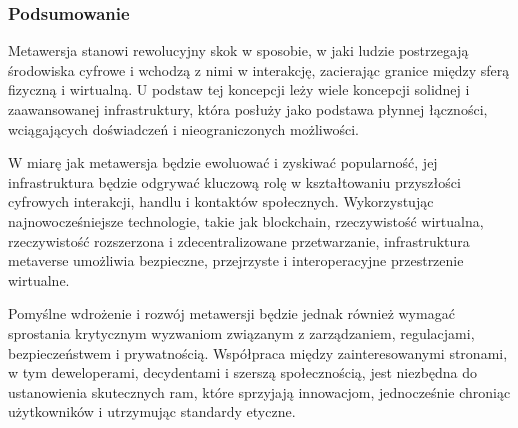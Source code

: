 \subsubsection{Podsumowanie}

Metawersja stanowi rewolucyjny skok w sposobie, w jaki ludzie postrzegają środowiska cyfrowe i wchodzą z nimi w interakcję, zacierając granice między sferą fizyczną i wirtualną. U podstaw tej koncepcji leży wiele koncepcji solidnej i zaawansowanej infrastruktury, która posłuży jako podstawa płynnej łączności, wciągających doświadczeń i nieograniczonych możliwości. 

W miarę jak metawersja będzie ewoluować i zyskiwać popularność, jej infrastruktura będzie odgrywać kluczową rolę w kształtowaniu przyszłości cyfrowych interakcji, handlu i kontaktów społecznych. Wykorzystując najnowocześniejsze technologie, takie jak blockchain, rzeczywistość wirtualna, rzeczywistość rozszerzona i zdecentralizowane przetwarzanie, infrastruktura metaverse umożliwia bezpieczne, przejrzyste i interoperacyjne przestrzenie wirtualne.

Pomyślne wdrożenie i rozwój metawersji będzie jednak również wymagać sprostania krytycznym wyzwaniom związanym z zarządzaniem, regulacjami, bezpieczeństwem i prywatnością. Współpraca między zainteresowanymi stronami, w tym deweloperami, decydentami i szerszą społecznością, jest niezbędna do ustanowienia skutecznych ram, które sprzyjają innowacjom, jednocześnie chroniąc użytkowników i utrzymując standardy etyczne.


